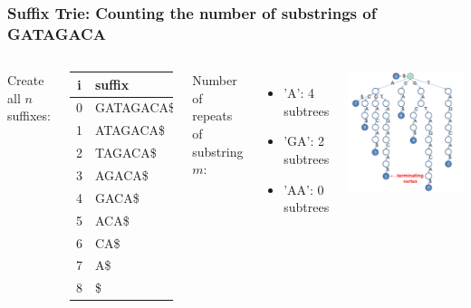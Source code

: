 \begin{frame}
  \frametitle{Suffix Trie: Counting the number of substrings of GATAGACA}
  \begin{columns}[T]
    {\smaller
    Create all $n$ suffixes:

    \begin{tabular}{c|l}
      i & suffix\\
      \hline
      0 & GATAGACA\$\\
      1 & ATAGACA\$\\
      2 & TAGACA\$\\
      3 & AGACA\$\\
      4 & GACA\$\\
      5 & ACA\$\\
      6 & CA\$\\
      7 & A\$\\
      8 & \$\\
    \end{tabular}\bigskip

    Number of repeats of substring $m$:
    \begin{itemize}
    \item 'A': 4 subtrees
    \item 'GA': 2 subtrees
    \item 'AA': 0 subtrees
    \end{itemize}}
    \includegraphics[width=.85\textwidth]{../img/suffixtrie_halim2}
  \end{columns}
\end{frame}

